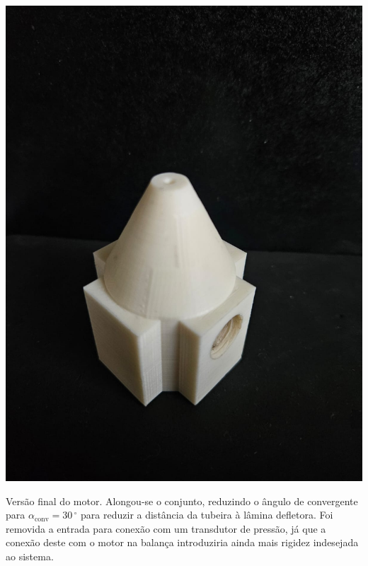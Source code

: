\begin{minipage}{.49\textwidth}
    \includegraphics[width=\textwidth]{img/app_dev_history/motor6.jpeg}
\end{minipage}
\begin{minipage}{.49\textwidth}
    Versão final do motor. Alongou-se o conjunto, reduzindo o ângulo de convergente para \(\alpha_{\mathrm{conv}} = 30\,\mathrm{^\circ}\) para reduzir a distância da tubeira à lâmina defletora. Foi removida a entrada para conexão com um transdutor de pressão, já que a conexão deste com o motor na balança introduziria ainda mais rigidez indesejada ao sistema.
\end{minipage}